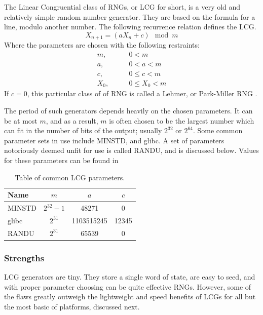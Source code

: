 The Linear Congruential class of RNGs, or LCG for short, is a very old and relatively simple random number generator. They are based on the formula for a line, modulo another number. The following recurrence relation defines the LCG.
\begin{equation} \label{eq:lcg}
    X_{n+1} = (aX_n + c) \mod m
\end{equation}
Where the parameters are chosen with the following restraints:
\begin{align*}
    m,   \qquad & 0 < m \\
    a,   \qquad & 0 < a < m \\
    c,   \qquad & 0 \leq c < m \\
    X_0, \qquad & 0 \leq X_0 < m
\end{align*}
If $c = 0$, this particular class of of RNG is called a Lehmer, or Park-Miller RNG \cite{Payne:1969:CLP:362848.362860,Park:1988:RNG:63039.63042}.

The period of such generators depends heavily on the chosen parameters. It can be at most $m$, and as a result, $m$ is often chosen to be the largest number which can fit in the number of bits of the output; usually $2^{32}$ or $2^{64}$. Some common parameter sets in use include MINSTD, and glibc. A set of parameters notoriously deemed unfit for use is called RANDU, and is discussed below. Values for these parameters can be found in

\begin{table}[tb]
    \caption{Table of common LCG parameters.}
    \label{tab:lcg_params}
    \begin{center}
        \begin{tabular}{l|ccc}
        \hline
        \hline
        \textbf{Name} & $m$ & $a$ & $c$ \\
        \hline
            MINSTD & $2^{32} - 1$ & 48271 & 0 \\
            glibc & $2^{31}$ & 1103515245 & 12345 \\
            RANDU & $2^{31}$ & 65539 & 0 \\
        \hline
        \hline
        \end{tabular}
    \end{center}
\end{table}

\subsubsection{Strengths}
LCG generators are tiny. They store a single word of state, are easy to seed, and with proper parameter choosing can be quite effective RNGs. However, some of the flaws greatly outweigh the lightweight and speed benefits of LCGs for all but the most basic of platforms, discussed next.

